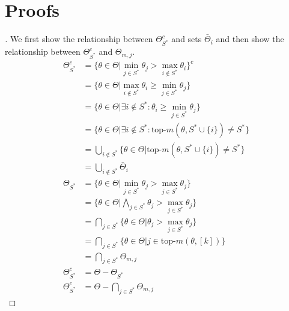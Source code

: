 \section{Proofs}\label{section:optimal_proofs}
\begin{proof}[]
  We first show the relationship between $\Theta_{S^*}^c$ and sets $\bar{\Theta}_i$ and then show the relationship between $\Theta_{S^*}^c$ and $\Theta_{m, j}$.
  \begin{align}
    \Theta_{S^*}^c &= \{\theta \in \Theta | \min_{j \in S^*} \theta_j > \max_{i \notin S^*} \theta_i \}^c \\
    &= \{\theta \in \Theta | \max_{i \notin S^*} \theta_i \geq \min_{j \in S^*} \theta_j\} \\
    &= \{\theta \in \Theta | \exists i \notin S^*: \theta_i \geq \min_{j \in S^*} \theta_j\} \\
    &= \{\theta \in \Theta | \exists i \notin S^*: \text{top-}m(\theta, S^* \cup \{i\}) \neq S^*\} \\
    &= \bigcup_{i \notin S^*} \{\theta \in \Theta | \text{top-}m(\theta, S^* \cup \{i\}) \neq S^*\} \\
    &= \bigcup_{i \notin S^*} \bar{\Theta}_i \\
    \Theta_{S^*} &= \{\theta \in \Theta | \min_{j \in S^*} \theta_j > \max_{j \in S^*} \theta_j\} \\
    &= \{\theta \in \Theta | \bigwedge_{j \in S^*} \theta_j > \max_{j \in S^*} \theta_j\} \\
    &= \bigcap_{j \in S^*} \{\theta \in \Theta | \theta_j > \max_{j \in S^*} \theta_j\} \\
    &= \bigcap_{j \in S^*} \{\theta \in \Theta | j \in \text{top-}m(\theta, [k])\} \\
    &= \bigcap_{j \in S^*} \Theta_{m, j} \\
    \Theta_{S^*}^c &= \Theta - \Theta_{S^*}\\
    \Theta_{S^*}^c &= \Theta - \bigcap_{j \in S^*} \Theta_{m, j}
  \end{align}
\end{proof}

